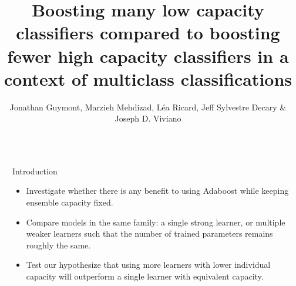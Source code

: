 \documentclass[final]{beamer}
\title{Boosting many low capacity classifiers compared to boosting fewer high capacity classifiers in a context of multiclass classifications} %
\author{Jonathan Guymont, Marzieh Mehdizad, L\'ea Ricard, Jeff Sylvestre Decary \& Joseph D. Viviano} %
\institute{Universit\'e de Montr\'eal and Polytechnique Montr\'eal} %
\newlength{\sepwid}
\newlength{\onecolwid}
\begin{document}

\setlength{\belowcaptionskip}{2ex} %
\setlength\belowdisplayshortskip{2ex} %

\begin{frame}[t] %

\begin{columns}[t] %

\begin{column}{\sepwid}\end{column} %

\begin{column}{\onecolwid} %




\begin{block}{Introduction}

\begin{itemize}
    \item Investigate whether there is any benefit to using Adaboost while keeping ensemble capacity fixed.
    \item Compare models in the same family: a single strong learner, or multiple weaker learners such that the number of trained parameters remains roughly the same. 
    \item Test our hypothesize that using more learners with lower individual capacity will outperform a single learner with equivalent capacity.
\end{itemize}
\end{block}




\end{column}
\end{columns}
\end{frame}
\end{document}
